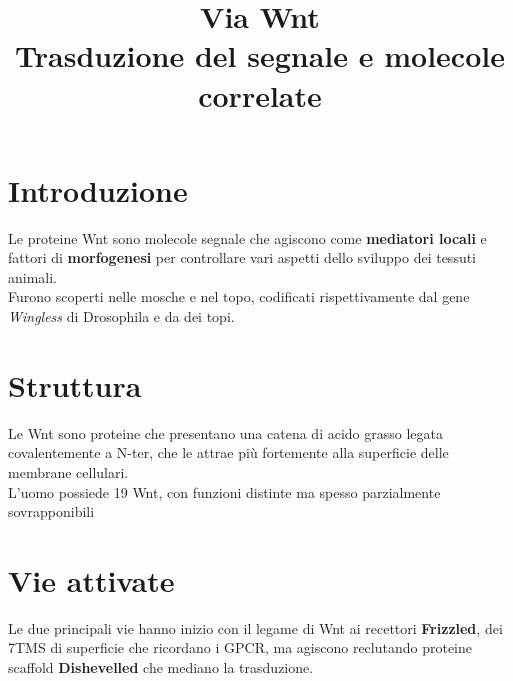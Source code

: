 \documentclass[a4paper, 12pt]{article}
\date{}
\title{%
  Via Wnt \\
  \large Trasduzione del segnale e molecole correlate
}
\begin{document}
\maketitle

\section{Introduzione}
Le proteine Wnt sono molecole segnale che agiscono come \textbf{mediatori locali} e fattori di \textbf{morfogenesi} per controllare vari aspetti dello sviluppo dei tessuti animali.\\
Furono scoperti nelle mosche e nel topo, codificati rispettivamente dal gene \textit{Wingless} di Drosophila e da  dei topi.

\section{Struttura}
Le Wnt sono proteine che presentano una catena di acido grasso legata covalentemente a N-ter, che le attrae più fortemente alla superficie delle membrane cellulari.\\
L'uomo possiede 19 Wnt, con funzioni distinte ma spesso parzialmente sovrapponibili

\section{Vie attivate}
Le due principali vie hanno inizio con il legame di Wnt ai recettori \textbf{Frizzled}, dei 7TMS di superficie che ricordano i GPCR, ma agiscono reclutando proteine scaffold \textbf{Dishevelled} che mediano la trasduzione.
\end{document}
